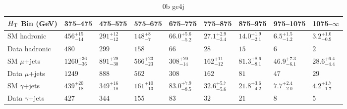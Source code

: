 \documentclass[8pt]{article}
\def\scalht{\mbox{$H_{\rm{T}}$}\xspace}
\newcommand\T{\rule{0pt}{2.6ex}}
\newcommand\B{\rule[-1.2ex]{0pt}{0pt}}
\begin{document}
\begin{table}[ht!]
\caption{0b ge4j}
\label{tab:ensemble-0b ge4j}
\centering
\begin{tabular}{ lllllllll }

\hline
\scalht Bin (GeV)       & 375--475                       & 475--575                       & 575--675                       & 675--775                       & 775--875                       & 875--975                       & 975--1075                      & 1075--$\infty$                 \\ [1.000000ex]
\hline
SM hadronic\T           & $456^{+15}_{-14}$              & $291^{+12}_{-12}$              & $148^{+8}_{-7}$                & $66.0^{+5.6}_{-5.2}$           & $27.1^{+2.9}_{-3.4}$           & $14.0^{+1.9}_{-2.1}$           & $6.5^{+1.5}_{-1.2}$            & $3.2^{+1.0}_{-0.9}$            \\ 
Data hadronic\B         & $480$                          & $299$                          & $158$                          & $66$                           & $28$                           & $15$                           & $6$                            & $2$                            \\ 
\hline
SM $\mu$+jets\T         & $1260^{+36}_{-36}$             & $891^{+29}_{-30}$              & $566^{+23}_{-23}$              & $308^{+20}_{-14}$              & $162^{+11}_{-12}$              & $81.3^{+8.6}_{-8.1}$           & $46.9^{+7.3}_{-6.1}$           & $28.6^{+6.4}_{-4.4}$           \\ 
Data $\mu$+jets\B       & $1249$                         & $888$                          & $562$                          & $308$                          & $162$                          & $81$                           & $47$                           & $29$                           \\ 
\hline
SM $\gamma$+jets\T      & $439^{+20}_{-18}$              & $349^{+16}_{-18}$              & $161^{+10}_{-13}$              & $83.0^{+7.9}_{-8.5}$           & $32.6^{+5.7}_{-5.6}$           & $21.8^{+3.6}_{-4.2}$           & $7.7^{+2.4}_{-2.0}$            & $4.2^{+1.7}_{-1.7}$            \\ 
Data $\gamma$+jets\B    & $427$                          & $344$                          & $155$                          & $83$                           & $32$                           & $21$                           & $8$                            & $5$                            \\ 
\hline

\end{tabular}
\end{table}
\end{document}
